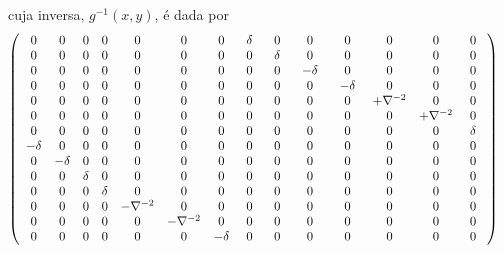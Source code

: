 \documentclass[a4paper,thmsa,12pt]{report}
\begin{document}
cuja inversa, $g^{-1}(x,y)$,  \'e dada por
\begin{eqnarray}
\left( 
\begin{array}{cccccccccccccc}
0 & 0 & 0 & 0 & 0 & 0 & 0 & \hspace{0.05in}\delta \hspace{0.05in} & 0 & 0 & 0
& 0 & 0 & 0 \\ 
0 & 0 & 0 & 0 & 0 & 0 & 0 & 0 & \hspace{0.05in}\delta \hspace{0.05in} & 0 & 0
& 0 & 0 & 0 \\ 
0 & 0 & 0 & 0 & 0 & 0 & 0 & 0 & 0 & \hspace{0.05in}-\delta \hspace{0.05in} & 
0 & 0 & 0 & 0 \\ 
0 & 0 & 0 & 0 & 0 & 0 & 0 & 0 & 0 & 0 & \hspace{0.05in}-\delta \hspace{0.05in%
} & 0 & 0 & 0 \\ 
0 & 0 & 0 & 0 & 0 & 0 & 0 & 0 & 0 & 0 & 0 & +\nabla ^{-2} & 0 & 0 \\ 
0 & 0 & 0 & 0 & 0 & 0 & 0 & 0 & 0 & 0 & 0 & 0 & +\nabla ^{-2} & 0 \\ 
0 & 0 & 0 & 0 & 0 & 0 & 0 & 0 & 0 & 0 & 0 & 0 & 0 & \hspace{0.05in}\delta 
\hspace{0.05in} \\ 
-\delta & 0 & 0 & 0 & 0 & 0 & 0 & 0 & 0 & 0 & 0 & 0 & 0 & 0 \\ 
0 & -\delta & 0 & 0 & 0 & 0 & 0 & 0 & 0 & 0 & 0 & 0 & 0 & 0 \\ 
0 & 0 & \delta & 0 & 0 & 0 & 0 & 0 & 0 & 0 & 0 & 0 & 0 & 0 \\ 
0 & 0 & 0 & \delta & 0 & 0 & 0 & 0 & 0 & 0 & 0 & 0 & 0 & 0 \\ 
0 & 0 & 0 & 0 & -\nabla ^{-2} & 0 & 0 & 0 & 0 & 0 & 0 & 0 & 0 & 0 \\ 
0 & 0 & 0 & 0 & 0 & -\nabla ^{-2} & 0 & 0 & 0 & 0 & 0 & 0 & 0 & 0 \\ 
0 & 0 & 0 & 0 & 0 & 0 & -\delta & 0 & 0 & 0 & 0 & 0 & 0 & 0
\end{array}
\right)  \label{359} \nonumber \\
&&
\end{eqnarray}
\end{document}
